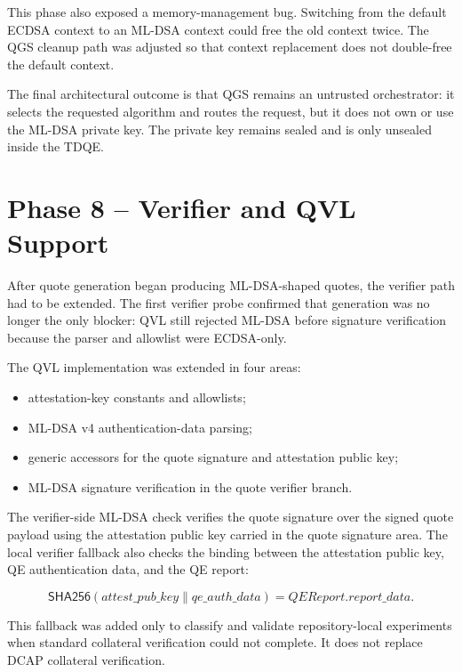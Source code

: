 This phase also exposed a memory-management bug. Switching from the default
ECDSA context to an ML-DSA context could free the old context twice. The QGS
cleanup path was adjusted so that context replacement does not double-free the
default context.

The final architectural outcome is that QGS remains an untrusted orchestrator:
it selects the requested algorithm and routes the request, but it does not own
or use the ML-DSA private key. The private key remains sealed and is only
unsealed inside the TDQE.

\section{Phase 8 -- Verifier and QVL Support}

After quote generation began producing ML-DSA-shaped quotes, the verifier path
had to be extended. The first verifier probe confirmed that generation was no
longer the only blocker: QVL still rejected ML-DSA before signature verification
because the parser and allowlist were ECDSA-only.

The QVL implementation was extended in four areas:

\begin{itemize}
  \item attestation-key constants and allowlists;
  \item ML-DSA v4 authentication-data parsing;
  \item generic accessors for the quote signature and attestation public key;
  \item ML-DSA signature verification in the quote verifier branch.
\end{itemize}

The verifier-side ML-DSA check verifies the quote signature over the signed
quote payload using the attestation public key carried in the quote signature
area. The local verifier fallback also checks the binding between the
attestation public key, QE authentication data, and the QE report:

\begin{equation}
  \mathsf{SHA256}(attest\_pub\_key \parallel qe\_auth\_data)
  =
  QEReport.report\_data.
\end{equation}

This fallback was added only to classify and validate repository-local
experiments when standard collateral verification could not complete. It does
not replace DCAP collateral verification.

